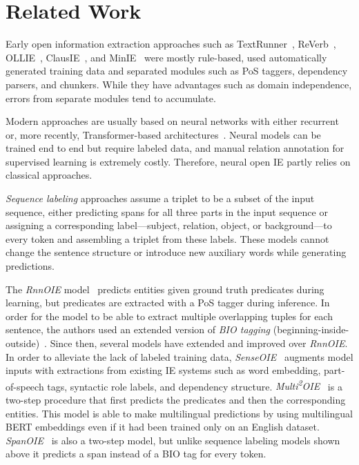 \documentclass[letterpaper]{article} \usepackage{aaai22}  \usepackage{times}  \usepackage{helvet}  \usepackage{courier}  \usepackage[hyphens]{url}  \usepackage{graphicx} \usepackage{placeins}
\begin{document}
\section{Related Work}\label{sec:relatedwork}
Early open information extraction approaches such as TextRunner~\cite{etzioni2008open},  ReVerb~\cite{fader2011identifying}, OLLIE~\cite{schmitz2012open},  ClausIE~\cite{del2013clausie}, and MinIE~\cite{gashteovski2017minie} were mostly rule-based, used automatically generated training data and separated modules such as PoS taggers, dependency parsers, and chunkers. While they have advantages such as domain independence, errors from separate modules tend to accumulate.

Modern approaches are usually based on neural networks with either recurrent~\cite{stanovsky-etal-2018-supervised,cui-etal-2018-neural} or, more recently, Transformer-based architectures~\cite{kolluru2020openie6,kolluru2020imojie}. Neural models can be trained end to end but require labeled data, and manual relation annotation for supervised learning is extremely costly. Therefore, neural open IE partly relies on classical approaches. 

\textit{Sequence labeling} approaches assume a triplet to be a subset of the input sequence, either predicting spans for all three parts in the input sequence or assigning a corresponding label---subject, relation, object, or background---to every token and assembling a triplet from these labels. 
These models cannot change the sentence structure or introduce new auxiliary words while generating predictions.

The \emph{RnnOIE} model~\cite{stanovsky-etal-2018-supervised} predicts entities given ground truth predicates during learning, but predicates are extracted with a PoS tagger during inference. In order for the model to be able to extract multiple overlapping tuples for each sentence, the authors used an extended version of \emph{BIO tagging} (beginning-inside-outside)~\cite{ramshaw1999text}.
Since then, several models have extended and improved over \emph{RnnOIE}.
In order to alleviate the lack of labeled training data, \emph{SenseOIE}~\cite{roy-etal-2019-supervising} augments model inputs with extractions from existing IE systems such as word embedding, part-of-speech tags, syntactic role labels, and dependency structure.
\emph{Multi\textsuperscript{2}OIE}~\cite{ro2020multi} is a two-step procedure that first predicts the predicates and then the corresponding entities. This model is able to make multilingual predictions by using multilingual BERT embeddings even if it had been trained only on an English dataset. \emph{SpanOIE}~\cite{zhan2020span} is also a two-step model, but unlike sequence labeling models shown above it predicts a span instead of a BIO tag for every token.
\end{document}
